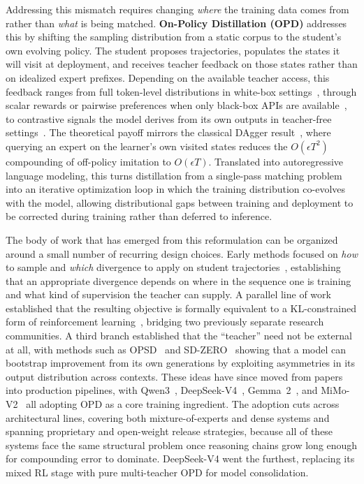 \documentclass{article} %
\begin{document}
Addressing this mismatch requires changing \emph{where} the training data comes from rather than \emph{what} is being matched. \textbf{On-Policy Distillation (OPD)} addresses this by shifting the sampling distribution from a static corpus to the student's own evolving policy. The student proposes trajectories, populates the states it will visit at deployment, and receives teacher feedback on those states rather than on idealized expert prefixes. Depending on the available teacher access, this feedback ranges from full token-level distributions in white-box settings~\citep{2306.13649,2306.08543}, through scalar rewards or pairwise preferences when only black-box APIs are available~\citep{2511.10643,2305.12870}, to contrastive signals the model derives from its own outputs in teacher-free settings~\citep{2601.18734}. The theoretical payoff mirrors the classical DAgger result~\citep{ross2011reduction}, where querying an expert on the learner's own visited states reduces the $O(\epsilon T^2)$ compounding of off-policy imitation to $O(\epsilon T)$. Translated into autoregressive language modeling, this turns distillation from a single-pass matching problem into an iterative optimization loop in which the training distribution co-evolves with the model, allowing distributional gaps between training and deployment to be corrected during training rather than deferred to inference.

The body of work that has emerged from this reformulation can be organized around a small number of recurring design choices. Early methods focused on \emph{how} to sample and \emph{which} divergence to apply on student trajectories~\citep{2306.13649,2306.08543,2402.03898}, establishing that an appropriate divergence depends on where in the sequence one is training and what kind of supervision the teacher can supply. A parallel line of work established that the resulting objective is formally equivalent to a KL-constrained form of reinforcement learning~\citep{2602.12125}, bridging two previously separate research communities. A third branch established that the ``teacher'' need not be external at all, with methods such as OPSD~\citep{2601.18734} and SD-ZERO~\citep{he2026selfdistillation} showing that a model can bootstrap improvement from its own generations by exploiting asymmetries in its output distribution across contexts. These ideas have since moved from papers into production pipelines, with Qwen3~\citep{2505.09388}, DeepSeek-V4~\citep{deepseekv4}, Gemma~2~\citep{2408.00118}, and MiMo-V2~\citep{2601.02780} all adopting OPD as a core training ingredient. The adoption cuts across architectural lines, covering both mixture-of-experts and dense systems and spanning proprietary and open-weight release strategies, because all of these systems face the same structural problem once reasoning chains grow long enough for compounding error to dominate. DeepSeek-V4 went the furthest, replacing its mixed RL stage with pure multi-teacher OPD for model consolidation.
\end{document}
